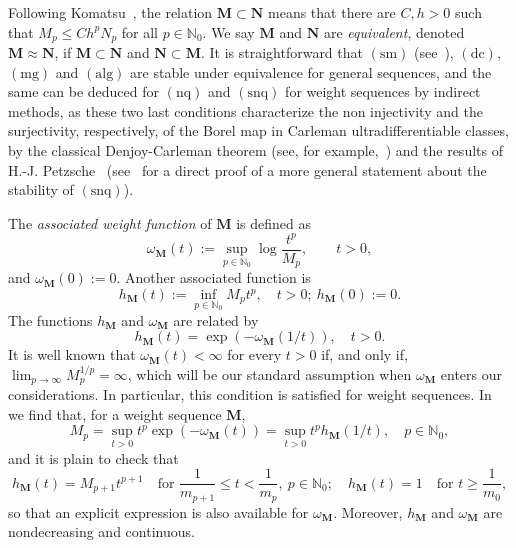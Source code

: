 \documentclass[12pt,a4paper]{article}
\newcommand{\N}{\mathbb{N}}
\newcommand{\M}{{\boldsymbol{M}}}
\newcommand{\NN}{{\boldsymbol{N}}}
\newcommand{\dc}{\operatorname{(dc)}}
\newcommand{\mg}{\operatorname{(mg)}}
\newcommand{\alg}{\operatorname{(alg)}}
\newcommand{\nq}{\operatorname{(nq)}}
\newcommand{\snq}{\operatorname{(snq)}}
\newcommand{\sm}{\operatorname{(sm)}}
\newcommand{\om}{\omega}
\theoremstyle{plain}
\theoremstyle{definition}
\numberwithin{equation}{section}
\begin{document}
Following Komatsu~\cite{Komatsu}, the relation $\M \subset \NN$ means that there are $C,h > 0$ such that $M_p \leq Ch^pN_p$ for all $p \in \N_0$. We say $\M$ and $\NN$ are \emph{equivalent}, denoted  $\M \approx \NN$, if $\M \subset \NN$ and $\NN \subset \M$. It is straightforward that $\sm$ (see~\cite[Lemma 2.4]{JimenezMiguelSanzSchindlSurjectSM}), $\dc$, $\mg$ and $\alg$ are stable under equivalence for general sequences, and the same can be deduced for $\nq$ and $\snq$ for weight sequences by indirect methods, as these two last conditions characterize the non injectivity and the surjectivity, respectively, of the Borel map in Carleman ultradifferentiable classes, by the classical Denjoy-Carleman theorem (see, for example,~\cite{RudinRCA}) and the results of H.-J. Petzsche~\cite[Cor. 3.2]{Petzsche88} (see~\cite[Cor. 3.14]{JimenezSanzSchindlIndex} for a direct proof of a more general statement about the stability of $\snq$).

The \emph{associated weight function} of $\M$ is defined as
$$
\omega_{\M}(t) := \sup_{p \in \N_0} \log \frac{t^p}{M_p}, \qquad t > 0,
$$
and $\omega_{\M}(0) := 0$. Another associated function is
\begin{equation*}
	h_\M(t):=\inf_{p\in\N_0}M_p t^p, \quad t>0;\ h_\M(0):=0.
\end{equation*}
The functions $h_\M$ and $\omega_\M$ are related by
\begin{equation}\label{functionhequ2}
	h_\M(t)=\exp(-\omega_\M(1/t)),\quad t>0.
\end{equation}
It is well known that $\om_{\M}(t)<\infty$ for every $t>0$ if, and only if, $\lim_{p\to\infty}M_p^{1/p}=\infty$, which will be our standard assumption when $\om_{\M}$ enters our considerations. In particular, this condition is satisfied for weight sequences. In~\cite[Prop.~3.2]{Komatsu} we find that, for a weight sequence $\M$,
\begin{equation}\label{eq.MpfromomegaM}
	M_p=\sup_{t>0}t^p\exp(-\om_{\M}(t))=\sup_{t>0}t^p h_{\M}(1/t),\quad p\in\N_0,
\end{equation}
and it is plain to check that
\begin{equation}\label{eq.expression_h_M}
h_\M(t)=M_{p+1}t^{p+1} \quad\textrm{for }\frac{1}{m_{p+1}}\le t <\frac{1}{m_p},\ p\in\N_0;\quad h_\M(t)=1\quad\textrm{for }t\ge\frac{1}{m_0},
\end{equation}
so that an explicit expression is also available for $\om_{\M}$.
Moreover, $h_\M$ and $\om_{\M}$ are nondecreasing and continuous.
\end{document}
